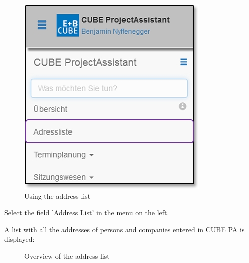 \begin{figure}   %
  \vspace{-35pt}      %
  \begin{center}
    \includegraphics[width=1\linewidth]{../chapters/03_Adressliste/pictures/3-1_Menu_Adressliste.jpg}
  \end{center}
  \vspace{-20pt}
  \caption{Using the address list}
  \vspace{-10pt}
\end{figure}

Select the field 'Address List' in the menu on the left.

\vspace{7cm}

A list with all the addresses of persons and companies entered in CUBE PA is displayed:

\begin{figure}[H]
\caption{Overview of the address list}
\end{figure}

